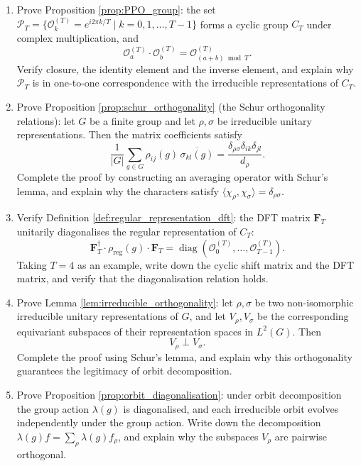 \begin{enumerate}[leftmargin=3em, label=\textbf{Exercise \arabic*}]
    \item Prove Proposition \ref{prop:PPO_group}:
    the set $\mathcal{P}_T=\{\mathcal{O}_k^{(T)}=e^{i2\pi k/T}\mid k=0,1,\dots,T-1\}$
    forms a cyclic group $C_T$ under complex multiplication, and
    \[
    \mathcal{O}_a^{(T)}\cdot\mathcal{O}_b^{(T)}=\mathcal{O}_{(a+b)\bmod T}^{(T)}.
    \]
    Verify closure, the identity element and the inverse element, and explain why $\mathcal{P}_T$ is in one-to-one correspondence with the irreducible representations of $C_T$.

    \item Prove Proposition \ref{prop:schur_orthogonality} (the Schur orthogonality relations):
    let $G$ be a finite group and let $\rho,\sigma$ be irreducible unitary representations. Then the matrix coefficients satisfy
    \[
    \frac{1}{|G|}\sum_{g\in G}\rho_{ij}(g)\,\overline{\sigma_{kl}(g)}
    =\frac{\delta_{\rho\sigma}\delta_{ik}\delta_{jl}}{d_\rho}.
    \]
    Complete the proof by constructing an averaging operator with Schur's lemma,
    and explain why the characters satisfy $\langle\chi_\rho,\chi_\sigma\rangle=\delta_{\rho\sigma}$.

    \item Verify Definition \ref{def:regular_representation_dft}:
    the DFT matrix $\mathbf{F}_T$ unitarily diagonalises the regular representation of $C_T$:
    \[
    \mathbf{F}_T^\dagger\cdot\rho_{\text{reg}}(g)\cdot\mathbf{F}_T
    =\operatorname{diag}(\mathcal{O}_0^{(T)},\dots,\mathcal{O}_{T-1}^{(T)}).
    \]
    Taking $T=4$ as an example, write down the cyclic shift matrix and the DFT matrix,
    and verify that the diagonalisation relation holds.

    \item Prove Lemma \ref{lem:irreducible_orthogonality}:
    let $\rho,\sigma$ be two non-isomorphic irreducible unitary representations of $G$,
    and let $V_\rho,V_\sigma$ be the corresponding equivariant subspaces of their representation spaces in $L^2(G)$. Then
    \[
    V_\rho\perp V_\sigma.
    \]
    Complete the proof using Schur's lemma,
    and explain why this orthogonality guarantees the legitimacy of orbit decomposition.

    \item Prove Proposition \ref{prop:orbit_diagonalisation}:
    under orbit decomposition the group action $\lambda(g)$ is diagonalised,
    and each irreducible orbit evolves independently under the group action.
    Write down the decomposition $\lambda(g)f=\sum_\rho\lambda(g)f_\rho$,
    and explain why the subspaces $V_\rho$ are pairwise orthogonal.


\end{enumerate}
